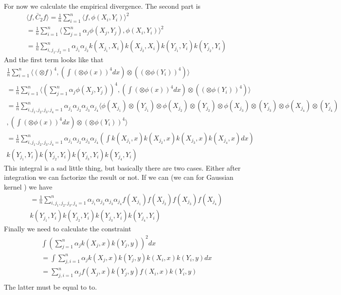 \documentclass[10pt]{article}
\begin{document}
For now we calculate the empirical divergence. The second part is
\begin{align}
  \langle f, \bar C_2 f \rangle = \frac 1 n \sum_{i=1}^n \langle f , \phi(X_i,Y_i) \rangle^2 \\
  = \frac 1 n \sum_{i=1}^n \langle \sum_{j=1}^{n} \alpha_j \phi(X_j,Y_j) , \phi(X_i,Y_i) \rangle^2 \\
   = \frac 1 n \sum_{i,j_1,j_2=1}^n \alpha_{j_1} \alpha_{j_2} k(X_{j_1},X_i) k(X_{j_2},X_i)  k(Y_{j_1},Y_i) k(Y_{j_2},Y_i) 
\end{align}
And the first term looks like that 
\begin{align}
  \frac 1 n \sum_{i=1}^n \langle  (\otimes f)^4  ,  \left( \int  (\otimes \phi(x))^4 dx  \right)  \otimes \left(    (\otimes \phi(Y_{i}))^4 \right) \rangle \\
  = \frac 1 n \sum_{i=1}^n \langle  ( \sum_{j=1}^{n} \alpha_j \phi(X_j,Y_j))^4  ,  \left( \int  (\otimes \phi(x))^4 dx  \right)  \otimes \left(    (\otimes \phi(Y_{i}))^4 \right) \rangle \\
  =\frac 1 n \sum_{i,j_1,j_2,j_3,j_4=1}^n  \alpha_{j_1} \alpha_{j_2} \alpha_{j_3} \alpha_{j_4} \langle \phi(X_{j_1}) \otimes (Y_{j_1}) \otimes  \phi(X_{j_2}) \otimes (Y_{j_2}) \otimes  \phi(X_{j_3}) \otimes (Y_{j_3}) \otimes  \phi(X_{j_4}) \otimes (Y_{j_4})\\
  ,\left( \int  (\otimes \phi(x))^4 dx  \right)  \otimes \left(    \otimes \phi(Y_{i}) \right)^4 \rangle \\
  =\frac 1 n \sum_{i,j_1,j_2,j_3,j_4=1}^n  \alpha_{j_1} \alpha_{j_2} \alpha_{j_3} \alpha_{j_4} \left( \int k(X_{j_1},x) k(X_{j_2},x) k(X_{j_3},x) k(X_{j_4},x)  dx \right) \\ 
    k(Y_{j_1},Y_i) k(Y_{j_2},Y_i)k(Y_{j_3},Y_i)k(Y_{j_4},Y_i)
\end{align}
This integral is a sad little thing, but basically there are two cases. Either after integration we can factorize the result or not. If we can (we can for Gaussian kernel ) we have  
\begin{align}
 =\frac 1 n \sum_{i,j_1,j_2,j_3,j_4=1}^n  \alpha_{j_1} \alpha_{j_2} \alpha_{j_3} \alpha_{j_4}  f(X_{j_1}) f(X_{j_2}) f(X_{j_3}) f(X_{j_4})   \\ 
    k(Y_{j_1},Y_i) k(Y_{j_2},Y_i)k(Y_{j_3},Y_i)k(Y_{j_4},Y_i)
\end{align}
Finally we need to calculate the constraint
\begin{align}
 \int \left( \sum_{j=1}^{n} \alpha_j  k(X_{j},x)  k(Y_{j},y) \right )^2 dx \\ 
 = \int  \sum_{j,i=1}^{n} \alpha_j  k(X_{j},x)  k(Y_{j},y) k(X_{i},x)  k(Y_{i},y)  dx\\
 =   \sum_{j,i=1}^{n} \alpha_j  f(X_{j},x)  k(Y_{j},y) f(X_{i},x)  k(Y_{i},y)  \\
\end{align}
The latter must be equal to to.
\end{document}
